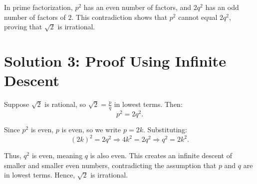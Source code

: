 \documentclass{article}
\begin{document}
In prime factorization, $p^2$ has an even number of factors, and $2q^2$ has an odd number of factors of $2$. This contradiction shows that $p^2$ cannot equal $2q^2$, proving that $\sqrt{2}$ is irrational.

\section*{Solution 3: Proof Using Infinite Descent}
Suppose $\sqrt{2}$ is rational, so $\sqrt{2} = \frac{p}{q}$ in lowest terms. Then:
\begin{equation}
    p^2 = 2q^2.
\end{equation}

Since $p^2$ is even, $p$ is even, so we write $p = 2k$. Substituting:
\begin{equation}
    (2k)^2 = 2q^2 \Rightarrow 4k^2 = 2q^2 \Rightarrow q^2 = 2k^2.
\end{equation}

Thus, $q^2$ is even, meaning $q$ is also even. This creates an infinite descent of smaller and smaller even numbers, contradicting the assumption that $p$ and $q$ are in lowest terms. Hence, $\sqrt{2}$ is irrational.
\end{document}
